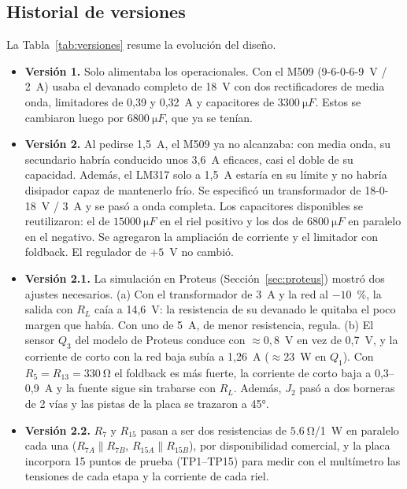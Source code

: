 \documentclass[conference]{IEEEtran}
\begin{document}
\subsection{Historial de versiones}
\label{sec:hist}
La Tabla~\ref{tab:versiones} resume la evolución del diseño.
\begin{itemize}
\item \textbf{Versión 1.} Solo alimentaba los operacionales. Con el M509 (9-6-0-6-9~V / 2~A) usaba el devanado completo de 18~V con dos rectificadores de media onda, limitadores de 0,39 y 0,32~A y capacitores de $\SI{3300}{\micro F}$. Estos se cambiaron luego por $\SI{6800}{\micro F}$, que ya se tenían.
\item \textbf{Versión 2.} Al pedirse 1,5~A, el M509 ya no alcanzaba: con media onda, su secundario habría conducido unos 3,6~A eficaces, casi el doble de su capacidad. Además, el LM317 solo a 1,5~A estaría en su límite y no habría disipador capaz de mantenerlo frío. Se especificó un transformador de 18-0-18~V / 3~A y se pasó a onda completa. Los capacitores disponibles se reutilizaron: el de $\SI{15000}{\micro F}$ en el riel positivo y los dos de $\SI{6800}{\micro F}$ en paralelo en el negativo. Se agregaron la ampliación de corriente y el limitador con foldback. El regulador de $+5$~V no cambió.
\item \textbf{Versión 2.1.} La simulación en Proteus (Sección~\ref{sec:proteus}) mostró dos ajustes necesarios. (a) Con el transformador de 3~A y la red al $-10$~\%, la salida con $R_L$ caía a 14,6~V: la resistencia de su devanado le quitaba el poco margen que había. Con uno de 5~A, de menor resistencia, regula. (b) El sensor $Q_3$ del modelo de Proteus conduce con $\approx0{,}8$~V en vez de 0,7~V, y la corriente de corto con la red baja subía a 1,26~A ($\approx23$~W en $Q_1$). Con $R_5=R_{13}=\SI{330}{\ohm}$ el foldback es más fuerte, la corriente de corto baja a 0,3--0,9~A y la fuente sigue sin trabarse con $R_L$. Además, $J_2$ pasó a dos borneras de 2 vías y las pistas de la placa se trazaron a 45°.
\item \textbf{Versión 2.2.} $R_7$ y $R_{15}$ pasan a ser dos resistencias de $\SI{5,6}{\ohm}$/1~W en paralelo cada una ($R_{7A}\parallel R_{7B}$, $R_{15A}\parallel R_{15B}$), por disponibilidad comercial, y la placa incorpora 15 puntos de prueba (TP1--TP15) para medir con el multímetro las tensiones de cada etapa y la corriente de cada riel.
\end{itemize}
\end{document}
